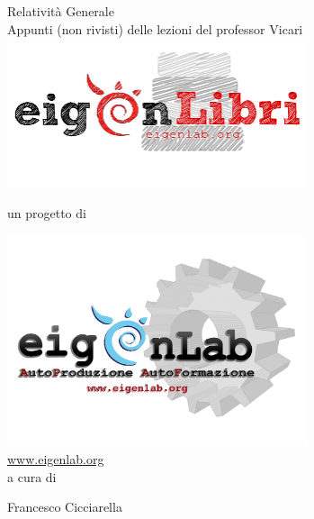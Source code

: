 \documentclass[12pt,a4paper]{report}
\theoremstyle{definition}
\begin{document}
\begin{titlepage}
\centering
{\Huge Relatività Generale}\\
\vspace*{0.5cm}
{\small Appunti (non rivisti) delle lezioni del professor Vicari}
 \\
\includegraphics[width=250pt,keepaspectratio=true]{Addons/eigenLibrichiaro}
\begin{center}
un progetto di
\end{center}
\includegraphics[width=250pt,keepaspectratio=true]{Addons/eigenlabinvertito2.png} \\
\url{www.eigenlab.org}
 \\
{\small a cura di}\\
\vspace*{0.5cm}
{\normalsize Francesco Cicciarella\par}
\end{titlepage}
\pagebreak
\end{document}
